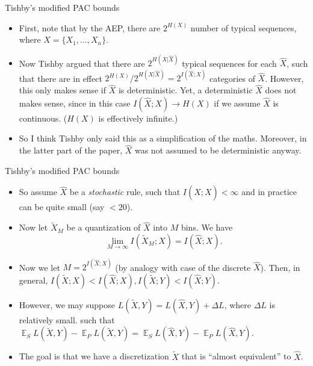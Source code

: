 \documentclass{beamer}
\DeclareMathOperator{\E}{\mathbb{E}}
\begin{document}
\begin{frame}{Tishby's modified PAC bounds}
\begin{itemize}
	\item First, note that by the AEP, there are $2^{H(X)}$ number of typical sequences, where $X=\{ X_1, \ldots, X_n \}$. 
	\item Now Tishby argued that there are $2^{H(X|\hat{X})}$ typical sequences for each $\hat{X}$, such that there are in effect $2^{H(X)}/2^{H(X|\hat{X})}=2^{I(\hat{X};X)}$ categories of $\hat{X}$. However, this only makes sense if $\hat{X}$ is deterministic. Yet, a deterministic $\hat{X}$ does not makes sense, since in this case $I(\hat{X};X) \rightarrow H(X)$ if we assume $\hat{X}$ is continuous. ($H(X)$ is effectively infinite.) 
	\item So I think Tishby only said this as a simplification of the maths. Moreover, in the latter part of the paper, $\hat{X}$ was not assumed to be deterministic anyway. 
\end{itemize}
\end{frame}


\begin{frame}{Tishby's modified PAC bounds}
\begin{itemize}
\item So assume $\hat{X}$ be a \emph{stochastic} rule, such that $I(\hat{X};X) < \infty$ and in practice can be quite small (say $< 20$). 
\item Now let $\tilde{X}_M$ be a quantization of $\hat{X}$ into $M$ bins. We have 
\[
\lim\limits_{M \rightarrow \infty} I(\tilde{X}_M; X) = I(\hat{X};X).
\]
\item Now we let $M=2^{I(\hat{X};X)}$ (by analogy with case of the discrete $\hat{X}$). Then, in general, $I(\tilde{X};X)  < I(\hat{X};X), I(\tilde{X};Y) < I(\hat{X};Y)$. 
\item However, we may suppose $L(\tilde{X},Y) = L(\hat{X},Y) + \Delta L$, where $\Delta L$ is relatively small. such that $\E_S L(\tilde{X},Y) - \E_P L(\tilde{X}, Y) = \E_S L(\hat{X},Y) - \E_P L(\hat{X}, Y)$. 
\item The goal is that we have a discretization $\tilde{X}$ that is ``almost equivalent'' to $\hat{X}$.
\end{itemize}
\end{frame}
\end{document}
